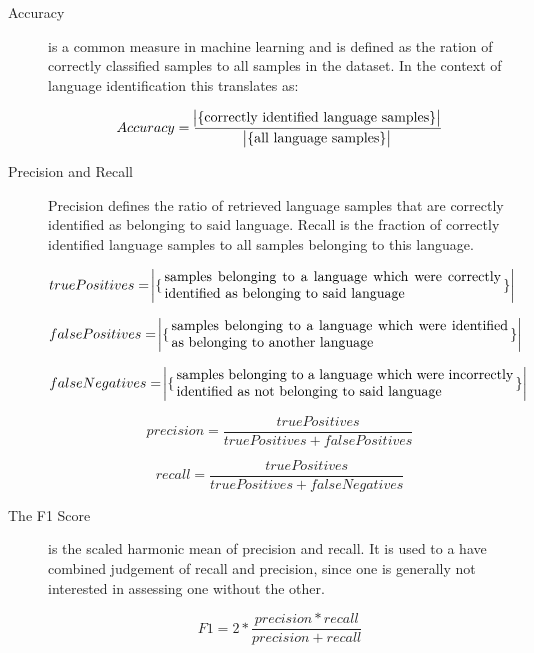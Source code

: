 \begin{description}
    \item[Accuracy] is a common measure in machine learning and is defined as the ration of correctly classified samples to all samples in the dataset. In the context of language identification this translates as:
     
    	$$
		Accuracy = \frac{\abs{\{\text{correctly identified language samples}\}}}{\abs{\{\text{all language samples}\}}}
		$$
     
    
    \item[Precision and Recall] Precision defines the ratio of retrieved language samples that are correctly identified as belonging to said language. Recall is the fraction of correctly identified language samples to all samples belonging to this language.
     
		$$
 		truePositives = \abs{\set{\parbox{0.7\textwidth}{samples belonging to a language which were correctly identified as belonging to said language}}} 
		$$

		$$
 		falsePositives = \abs{\set{\parbox{0.7\textwidth}{samples belonging to a language which were identified as belonging to another language}}} 
		$$
		
		$$
 		falseNegatives = \abs{\set{\parbox{0.7\textwidth}{samples belonging to a language which were incorrectly identified as not belonging to said language}}} 
		$$

	    $$
	    precision = \frac
	      {truePositives}
	      {truePositives + falsePositives}
	    $$
		
		$$
		recall = \frac
			{truePositives}
			{truePositives + falseNegatives}
		$$    


    \item[The F1 Score] is the scaled harmonic mean of precision and recall. It is used to a have combined judgement of recall and precision, since one is generally not interested in assessing one without the other.
    
    	$$
    	F1 = 2 * \frac{precision * recall}{precision + recall}
    	$$

\end{description}

